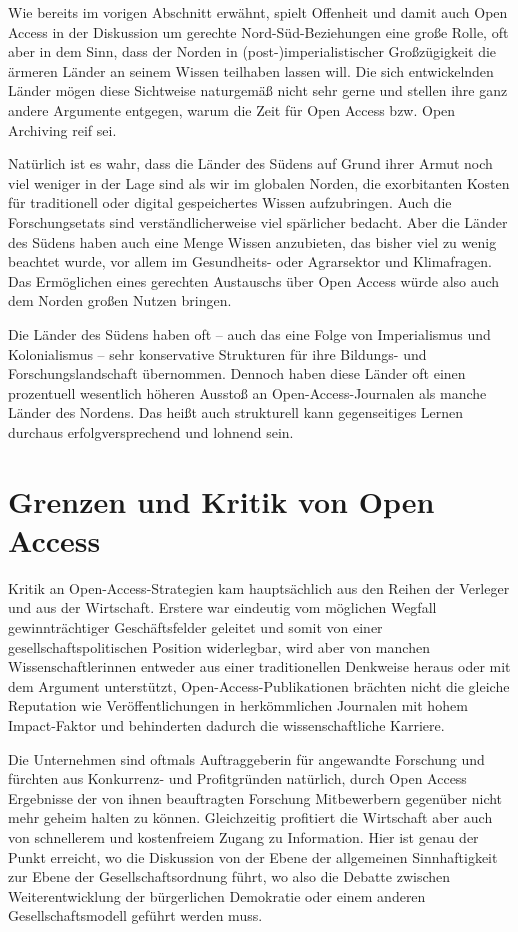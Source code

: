 \documentclass[a4paper,
fontsize=11pt,
oneside,
numbers=noperiodatend,
parskip=half-,
bibliography=totoc,
final
]{scrartcl}
\begin{document}
Wie bereits im vorigen Abschnitt erwähnt, spielt Offenheit und damit
auch Open Access in der Diskussion um gerechte Nord-Süd-Beziehungen eine
große Rolle, oft aber in dem Sinn, dass der Norden in
(post-)imperialistischer Großzügigkeit die ärmeren Länder an seinem
Wissen teilhaben lassen will. Die sich entwickelnden Länder mögen diese
Sichtweise naturgemäß nicht sehr gerne und stellen ihre ganz andere
Argumente entgegen, warum die Zeit für Open Access bzw. Open Archiving
reif sei.

Natürlich ist es wahr, dass die Länder des Südens auf Grund ihrer Armut
noch viel weniger in der Lage sind als wir im globalen Norden, die
exorbitanten Kosten für traditionell oder digital gespeichertes Wissen
aufzubringen. Auch die Forschungsetats sind verständlicherweise viel
spärlicher bedacht. Aber die Länder des Südens haben auch eine Menge
Wissen anzubieten, das bisher viel zu wenig beachtet wurde, vor allem im
Gesundheits- oder Agrarsektor und Klimafragen. Das Ermöglichen eines
gerechten Austauschs über Open Access würde also auch dem Norden großen
Nutzen bringen.

Die Länder des Südens haben oft -- auch das eine Folge von Imperialismus
und Kolonialismus -- sehr konservative Strukturen für ihre Bildungs- und
Forschungslandschaft übernommen. Dennoch haben diese Länder oft einen
prozentuell wesentlich höheren Ausstoß an Open-Access-Journalen als
manche Länder des Nordens. Das heißt auch strukturell kann gegenseitiges
Lernen durchaus erfolgversprechend und lohnend sein.

\hypertarget{grenzen-und-kritik-von-open-access}{%
\section*{Grenzen und Kritik von Open
Access}\label{grenzen-und-kritik-von-open-access}}

Kritik an Open-Access-Strategien kam hauptsächlich aus den Reihen der
Verleger und aus der Wirtschaft. Erstere war eindeutig vom möglichen
Wegfall gewinnträchtiger Geschäftsfelder geleitet und somit von einer
gesellschaftspolitischen Position widerlegbar, wird aber von manchen
Wissenschaftlerinnen entweder aus einer traditionellen Denkweise heraus
oder mit dem Argument unterstützt, Open-Access-Publikationen brächten
nicht die gleiche Reputation wie Veröffentlichungen in herkömmlichen
Journalen mit hohem Impact-Faktor und behinderten dadurch die
wissenschaftliche Karriere.

Die Unternehmen sind oftmals Auftraggeberin für angewandte Forschung und
fürchten aus Konkurrenz- und Profitgründen natürlich, durch Open Access
Ergebnisse der von ihnen beauftragten Forschung Mitbewerbern gegenüber
nicht mehr geheim halten zu können. Gleichzeitig profitiert die
Wirtschaft aber auch von schnellerem und kostenfreiem Zugang zu
Information. Hier ist genau der Punkt erreicht, wo die Diskussion von
der Ebene der allgemeinen Sinnhaftigkeit zur Ebene der
Gesellschaftsordnung führt, wo also die Debatte zwischen
Weiterentwicklung der bürgerlichen Demokratie oder einem anderen
Gesellschaftsmodell geführt werden muss.
\end{document}
